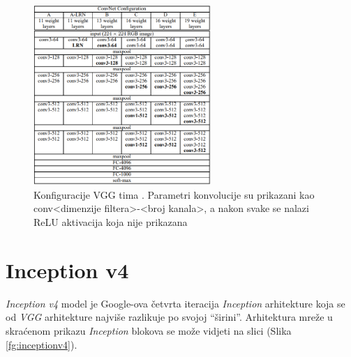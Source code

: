 \documentclass[times, utf8, proizvoljni, numeric]{fer}
\begin{document}
\begin{figure}[!ht]
	\begin{center}
		\captionsetup{justification=centering}
		\includegraphics[width=0.6\textwidth]{./imgs/vgg.png}
		\caption{Konfiguracije VGG tima \cite{VGG}. Parametri konvolucije su prikazani kao conv<dimenzije filtera>-<broj kanala>, a nakon svake se nalazi ReLU aktivacija koja nije prikazana}
		\label{fg:vgg}
	\end{center}
\end{figure}

\section{Inception v4}

\textit{Inception v4} model je Google-ova četvrta iteracija \textit{Inception} arhitekture koja se od \textit{VGG} arhitekture najviše razlikuje po svojoj “širini”.  Arhitektura mreže u skraćenom prikazu \textit{Inception} blokova se može vidjeti na slici (Slika \ref{fg:inceptionv4}). 
\end{document}
